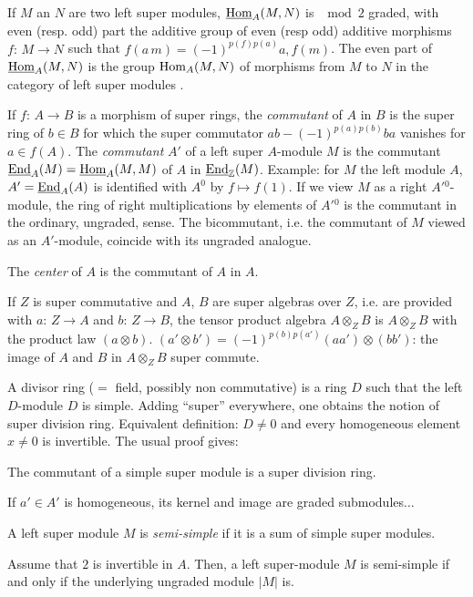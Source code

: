 If $M$ an $N$ are two left super modules,
$\underline{\text{\rm Hom}}_A(M,N)$ is $\mod{2}$ graded, with even
(resp. odd) part the additive group of even (resp odd)
additive morphisms $f\colon\,M\to N$ such that
$f(a\,m)=(-1)^{p(f)p(a)}a,f(m)$.
The even part of $\underline{\text{\rm Hom}}_A(M,N)$ is the group
$\text{\rm Hom}_A(M,N)$ of morphisms from $M$ to $N$ in the
category of left super modules .

If $f\colon\,A\to B$ is a morphism of super rings, the
{\it commutant} of $A$  in $B$ is the super ring of
$b\in B$ for which the super commutator
$ab-(-1)^{p(a)p(b)}ba$ vanishes for $a\in f(A)$.
The {\it commutant} $A'$ of a left super $A$-module $M$
is the commutant
$\underline{\text{\rm End}}_A(M)=\underline{\text{\rm Hom}}_A(M,M)$ of $A$
in $\underline{\text{\rm End}}_{\Bbb Z}(M)$.
Example:
for $M$ the left module $A$, $A'=\underline{\text{\rm End}}_A(A)$
is identified with $A^0$ by $f\mapsto f(1)$.
If we view $M$ as a right $A'{^0}$-module, the ring of
right multiplications by elements of $A'{^0}$ is the
commutant in the ordinary, ungraded, sense.
The bicommutant, i.e. the commutant of $M$ viewed as an
$A'$-module, coincide with its ungraded analogue.

The {\it center} of $A$ is the commutant of $A$ in $A$.

If $Z$ is super commutative and $A$, $B$ are super
algebras over $Z$, i.e. are provided with
$a\colon\,Z\to A$ and $b\colon\,Z\to B$, the tensor
product algebra $A\otimes_Z B$ is $A\otimes_Z B$ with
the product law $(a\otimes b)$.
$(a'\otimes b')=(-1)^{p(b)p(a')}(aa')\otimes(bb')$:
the image of $A$ and $B$ in $A\otimes_Z B$ super
commute.

A divisor ring ($=$ field, possibly non commutative) is
a ring $D$ such that the left $D$-module $D$ is simple.
Adding ``super'' everywhere, one obtains the notion of
super division ring.
Equivalent definition: $D\not=0$ and every homogeneous
element $x\not=0$ is invertible.
The usual proof gives:

The commutant of a simple super module is a super
division ring.
\endproclaim

If $a'\in A'$ is homogeneous, its kernel and image are
graded submodules$\ldots$
\enddemo

A left super module $M$ is {\it semi-simple} if it is a
sum of simple super modules.

Assume that $2$ is invertible in $A$.
Then, a left super-module $M$ is semi-simple if and
only if the underlying ungraded module $\vert M\vert$
is.
\endproclaim


